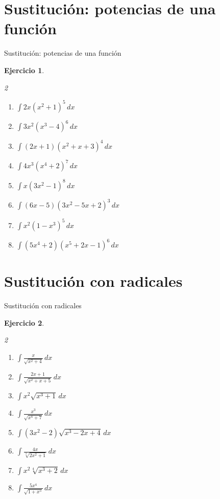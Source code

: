 \documentclass[10pt,aspectratio=169]{beamer}
\newtheorem{Ejer}{Ejercicio}
\begin{document}
\section{Sustitución: potencias de una función}
\begin{frame}{Sustitución: potencias de una función}
\begin{Ejer}
\begin{multicols}{2}
\begin{enumerate}
\item $\displaystyle \int 2x(x^2+1)^5\,dx$
\item $\displaystyle \int 3x^2(x^3-4)^6\,dx$
\item $\displaystyle \int(2x+1)(x^2+x+3)^4\,dx$
\item $\displaystyle \int 4x^3(x^4+2)^7\,dx$
\item $\displaystyle \int x(3x^2-1)^8\,dx$
\item $\displaystyle \int(6x-5)(3x^2-5x+2)^3\,dx$
\item $\displaystyle \int x^2(1-x^3)^5\,dx$
\item $\displaystyle \int(5x^4+2)(x^5+2x-1)^6\,dx$
\end{enumerate}
\end{multicols}
\end{Ejer}

\end{frame}

\section{Sustitución con radicales}
\begin{frame}{Sustitución con radicales}
\begin{Ejer}
\begin{multicols}{2}
\begin{enumerate}
\item $\displaystyle \int\frac{x}{\sqrt{x^2+4}}\,dx$
\item $\displaystyle \int\frac{2x+1}{\sqrt{x^2+x+5}}\,dx$
\item $\displaystyle \int x^2\sqrt{x^3+1}\,dx$
\item $\displaystyle \int\frac{x^3}{\sqrt{x^4+7}}\,dx$
\item $\displaystyle \int(3x^2-2)\sqrt{x^3-2x+4}\,dx$
\item $\displaystyle \int\frac{4x}{\sqrt[3]{2x^2+1}}\,dx$
\item $\displaystyle \int x^2\sqrt[4]{x^3+2}\,dx$
\item $\displaystyle \int\frac{5x^4}{\sqrt{1+x^5}}\,dx$
\end{enumerate}
\end{multicols}
\end{Ejer}

\end{frame}
\end{document}
